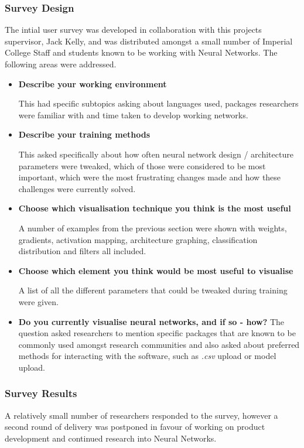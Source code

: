 \documentclass[a4paper,11pt,titlepage]{article}
\begin{document}
	\subsubsection{Survey Design}
	\par
	The intial user survey was developed in collaboration with this projects supervisor, Jack Kelly, and was distributed amongst a small number of Imperial College Staff and students known to be working with Neural Networks. The following areas were addressed.
	\begin{itemize}
	
		\item \textbf{Describe your working environment}
		\par
		This had specific subtopics asking about languages used, packages researchers were familiar with and time taken to develop working networks.
		\item \textbf{Describe your training methods}
		\par
		This asked specifically about how often neural network design / architecture parameters were tweaked, which of those were considered to be most important, which were the most frustrating changes made and how these challenges were currently solved.
		\item \textbf{Choose which visualisation technique you think is the most useful}
		\par 
		A number of examples from the previous section were shown with weights, gradients, activation mapping, architecture graphing, classification distribution and filters all included. 
		\item \textbf{Choose which element you think would be most useful to visualise}
		\par 
		A list of all the different parameters that could be tweaked during training were given.
		\item \textbf{Do you currently visualise neural networks, and if so - how?}
		The question asked researchers to mention specific packages that are known to be commonly used amongst research communities and also asked about preferred methods for interacting with the software, such as \textit{.csv} upload or model upload.
	
	\end{itemize}
	
	\subsubsection{Survey Results}
	\par 
	A relatively small number of researchers responded to the survey, however a second round of delivery was postponed in favour of working on product development and continued research into Neural Networks.
	\par
\end{document}
